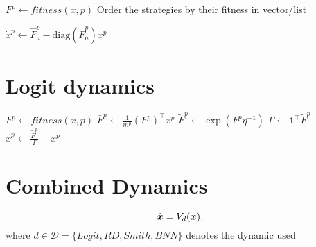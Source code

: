 \begin{algorithm}[H]

 \BlankLine
  {
  $ F^p \leftarrow fitness(x, p)$\;
  Order the strategies by their fitness in vector/list  \;
  
  $ \dot{x}^p \leftarrow \hat{F}_a^p - \text{diag}(\hat{F}_a^p) x^p $\;
 }
\end{algorithm}




\section{Logit dynamics}

\begin{algorithm}[H]

 \BlankLine
 
  {
  $ F^p \leftarrow fitness(x, p)$\;
  $ \bar{F}^p \leftarrow \frac{1}{m^p} (F^p)^\top x^p$\;
  $ \tilde{F}^p \leftarrow \exp( F^p \eta^{-1} )$\;
  $ \Gamma \leftarrow \boldsymbol{1}^\top \tilde{F}^p $\;
  $ \dot{x}^p \leftarrow \frac{\tilde{F}^p}{\Gamma} - x^p $\;
 }
\end{algorithm}




\section{Combined Dynamics}

\begin{equation}
\dot{ \boldsymbol{x} } = V_d( \boldsymbol{x} ),
\end{equation}
where $d\in \mathcal{D}=\{ Logit, RD, Smith, BNN \}$ denotes the dynamic used